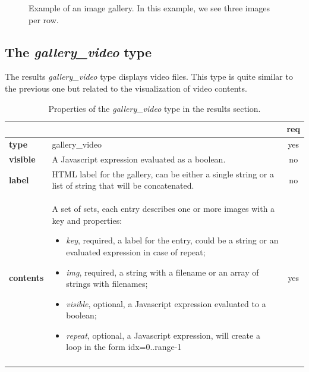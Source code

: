 \begin{figure}[h]
\centering
{}
\caption{Example of an image gallery. In this example, we see three images per row.}
\label{fig:image_gallery_example}
\end{figure}

\subsection{The \emph{gallery\_video} type}

The results \emph{gallery\_video} type displays video files. This type is quite similar to the previous one but related to the visualization of video contents.

\begin{longtable}{|>{\bf}L{\linewidth}|L{\linewidth}|c|}
\hline
      &  & {\bf req} 
\tabularnewline \hline \hline
 type       & gallery\_video  & yes \\ \hline
 visible    & A Javascript expression evaluated as a boolean. & no \\ \hline
 label      & HTML label for the gallery, can be either a single string or 
             a list of string that will be concatenated. & no \\ \hline
 contents   & A set of sets, each entry describes one or more images with a key and properties:
\vspace{-1em}
\begin{itemize}
    \setlength\itemsep{-0.5em}
    \item \textit{key}, required, a label for the entry, could be a string or an evaluated expression in case of repeat;
    \item \textit{img}, required, a string with a filename or an array of strings with filenames;
    \item \textit{visible}, optional, a Javascript expression evaluated to a boolean;
    \item \textit{repeat}, optional, a Javascript expression, will create a loop in the form idx=0..range-1
\end{itemize} 
\vspace{-1em} & yes \\ \hline
\caption{Properties of the \emph{gallery\_video} type in the results section.}
\end{longtable}

